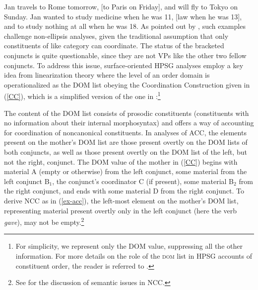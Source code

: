 {\eal
\label{ex-acc-eliptical}
\ex Jan travels to Rome tomorrow, [to Paris on Friday], and will fly to Tokyo
on Sunday. \label{acc2}
\ex Jan wanted to study medicine when he was 11, [law when he was 13],
and to study nothing at all when he was 18. \label{acc3}\zl
%
As pointed out by \citet{Beavers2004}, such examples challenge non-ellipsis analyses, given the traditional assumption that only 
constituents of like category can coordinate. The status of the bracketed conjuncts
is quite questionable, since they are not VPs like the other two fellow conjuncts.
To address this issue, surface-oriented HPSG analyses employ a key idea from linearization theory
where the level of an order domain is operationalized as the DOM list obeying the
Coordination Construction given in (\ref{CC}), which is a simplified
version of the one in \citet[(27)]{Beavers2004}:\footnote{For simplicity, we represent only the DOM value, suppressing all the other information. For more details on the role of the \textsc{dom} list in HPSG accounts of constituent order, the reader is referred to .}
%

\ea\label{CC}
\z
%
%
%
%
The content of the DOM list consists of prosodic constituents (constituents with no information about their internal morphosyntax) and offers a way of accounting for coordination of noncanonical constituents. In analyses of ACC, the elements present on the mother's DOM list are those present overtly on the DOM lists of both conjuncts, as well as those present overtly on the DOM list of the left, but not the right, conjunct. The DOM value of the mother in (\ref{CC}) begins with material A (empty or otherwise) from the left conjunct, some material from the left conjunct B$_{1}$, the conjunct's
coordinator C (if present), some material B$_{2}$
from the right conjunct, and ends with some material D from the right conjunct. To derive NCC as in (\ref{ex-acc}), the left-most element on the mother's DOM list, representing material present overtly only in the left conjunct (here the verb {\it gave}), may not be empty.\footnote{See \citet{Beavers2004} for the discussion of semantic issues
in NCC.}
 
}
